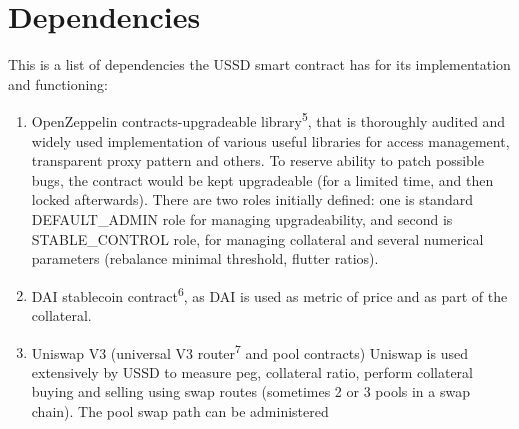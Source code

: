 \section{Dependencies}

This is a list of dependencies the USSD smart contract has for its implementation
and functioning:

\begin{enumerate}
  \item OpenZeppelin contracts-upgradeable library\textsuperscript{5}, that is 
  thoroughly audited and widely used implementation of various useful libraries for 
  access management, transparent proxy pattern and others. To reserve ability to 
  patch possible bugs, the contract would be kept upgradeable (for a limited time, 
  and then locked afterwards). There are two roles initially defined: one is standard
  DEFAULT\_ADMIN role for managing upgradeability, and second is STABLE\_CONTROL role,
  for managing collateral and several numerical parameters (rebalance minimal threshold,
  flutter ratios).
  \item DAI stablecoin contract\textsuperscript{6}, as     
       DAI is used as metric of price and as part of the collateral.
  \item Uniswap V3 (universal V3 router\textsuperscript{7} and pool contracts)
       Uniswap is used extensively by USSD to measure peg, collateral ratio, 
       perform collateral buying and selling using swap routes (sometimes 2 or 3 pools
       in a swap chain). The pool swap path can be administered
\end{enumerate}


\addtocounter{footnote}{1}
\addtocounter{footnote}{1}
\addtocounter{footnote}{1}

